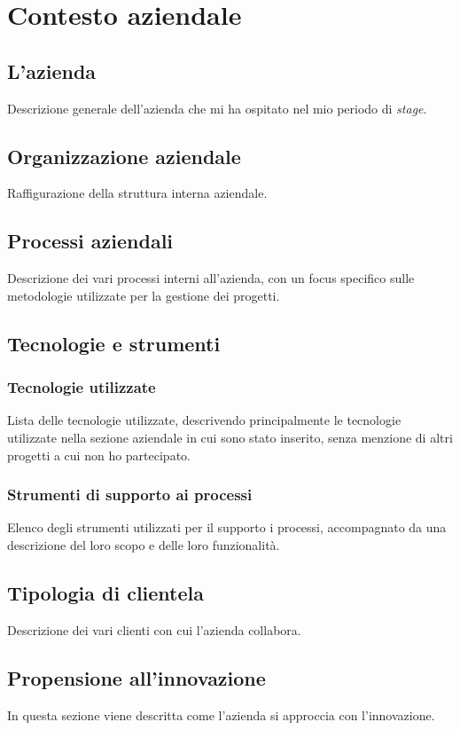 \chapter{Contesto aziendale}
\label{chap:contesto-aziendale}

\section{L'azienda}\noindent
Descrizione generale dell'azienda che mi ha ospitato nel mio periodo di \textit{stage}.

\section{Organizzazione aziendale}\noindent
Raffigurazione della struttura interna aziendale.

\section{Processi aziendali}\noindent
Descrizione dei vari processi interni all'azienda,  con un focus specifico sulle metodologie utilizzate per la gestione dei progetti.

\section{Tecnologie e strumenti}

\subsection{Tecnologie utilizzate}\noindent
Lista delle tecnologie utilizzate, descrivendo principalmente le tecnologie utilizzate nella sezione aziendale in cui sono stato inserito, senza menzione di altri progetti a cui non ho partecipato.

\subsection{Strumenti di supporto ai processi}\noindent
Elenco degli strumenti utilizzati per il supporto i processi, accompagnato da una descrizione del loro scopo e delle loro funzionalità.

\section{Tipologia di clientela}\noindent
Descrizione dei vari clienti con cui l'azienda collabora.

\section{Propensione all'innovazione}\noindent
In questa sezione viene descritta come l'azienda si approccia con l'innovazione.